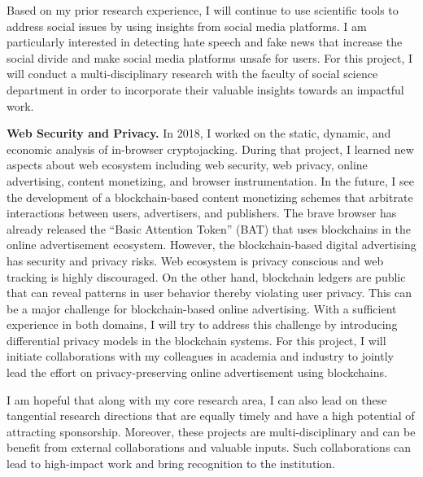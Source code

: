 \documentclass{NSF}
\newcommand{\BfPara}[1]{{\noindent\textbf{#1.}}\xspace}
\begin{document}
Based on my prior research experience, I will continue to use scientific tools to address social issues by using insights from social media platforms. I am particularly interested in detecting hate speech and fake news that increase the social divide and make social media platforms unsafe for users. For this project, I will conduct a multi-disciplinary research with the faculty of social science department in order to incorporate their valuable insights towards an impactful work.  


\vspace{2mm}
\BfPara{Web Security and Privacy} In 2018, I worked on the static, dynamic, and economic analysis of in-browser cryptojacking. During that project, I learned new aspects about web ecosystem including web security, web privacy, online advertising, content monetizing, and browser instrumentation. In the future, I see the development of a blockchain-based content monetizing schemes that arbitrate interactions between users, advertisers, and publishers. The brave browser has already released the ``Basic Attention Token'' (BAT) that uses blockchains in the online advertisement ecosystem. However, the blockchain-based digital advertising has security and privacy risks. Web ecosystem is privacy conscious and web tracking is highly discouraged. On the other hand, blockchain ledgers are public that can reveal patterns in user behavior thereby violating user privacy. This can be a major challenge for blockchain-based online advertising. With a sufficient experience in both domains, I will try to address this challenge by introducing differential privacy models in the blockchain systems. For this project, I will initiate collaborations with my colleagues in academia and industry to jointly lead the effort on privacy-preserving online advertisement using blockchains. 

\vspace{2mm}
I am hopeful that along with my core research area, I can also lead on these tangential research directions that are equally timely and have a high potential of attracting sponsorship. Moreover, these projects are multi-disciplinary and can be benefit from external collaborations and valuable inputs. Such collaborations can lead to high-impact work and bring recognition to the institution. 
\end{document}
